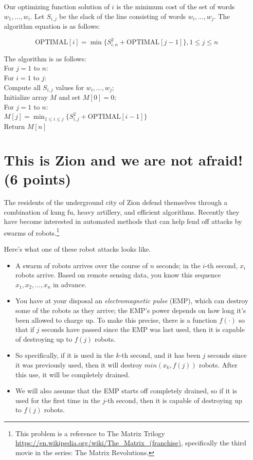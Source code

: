 \documentclass[letter,11pt]{article}
\begin{document}
Our optimizing function solution of $i$ is the minimum cost of the set of words $w_1, \dots, w_i$. Let $S_{i,j}$ be the slack of the line consisting of words $w_i,\dots,w_j$. The algorithm equation is as follows:

\[ \text{OPTIMAL}[i] = \min \{ S^2_{i,n} + \text{OPTIMAL}[j - 1] \}, 1 \leq j \leq n\]

\noindent The algorithm is as follows: \\
For $j = 1$ to $n$:\\
\indent For $i = 1$ to $j$:\\
\indent \indent Compute all $S_{i,j}$ values for $w_i,\dots,w_j$;\\
Initialize array $M$ and set $M[0] = 0$;\\
For $j = 1$ to $n$:\\
\indent $M[j] = \min_{1 \leq i \leq j} \{ S^2_{i,j} + \text{OPTIMAL}[i - 1] \}$\\
Return $M[n]$\\






\section{This is Zion and we are not afraid! (6 points)}
The residents of the underground city of Zion defend themselves through a combination of kung fu, heavy artillery, and efficient algorithms. Recently they have become interested in automated methods that can help fend off attacks by swarms of robots.\footnote{This problem is a reference to The Matrix Trilogy \url{https://en.wikipedia.org/wiki/The_Matrix_(franchise)}, specifically the third movie in the series: The Matrix Revolutions.}

Here’s what one of these robot attacks looks like.

\begin{itemize}
    \item A swarm of robots arrives over the course of $n$ seconds; in the $i$-th
    second, $x_i$ robots arrive. Based on remote sensing data, you know this sequence $x_1, x_2 , ..., x_n$ in advance.

    \item You have at your disposal an \textit{electromagnetic pulse} (EMP), which can destroy some of the robots as they arrive; the EMP's power depends on how long it's been allowed to charge up. To make this precise, there is a function $f(\cdot)$ so that if $j$ seconds have passed since the EMP was last used, then it is capable of destroying up to $f(j)$ robots.

    \item So specifically, if it is used in the $k$-th second, and it has been $j$ seconds since it was previously used, then it will destroy $min(x_k , f(j))$ robots. After this use, it will be completely drained.

    \item We will also assume that the EMP starts off completely drained, so if it is used for the first time in the $j$-th second, then it is capable of destroying up to $f(j)$ robots.
\end{itemize}
\end{document}
